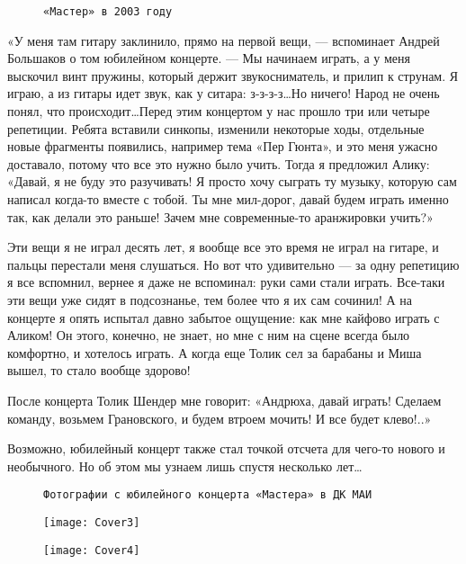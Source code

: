 \begin{figure}[h]
    \centering
    \caption{\texttt{«Мастер» в 2003 году}}
\end{figure}

«У меня там гитару заклинило, прямо на первой вещи, — вспоминает Андрей Большаков о том юбилейном концерте. — Мы
начинаем играть, а у меня выскочил винт пружины, который держит звукосниматель, и прилип к струнам. Я играю, а из гитары
идет звук, как у ситара: з-з-з-з\ldots Но ничего! Народ не очень понял, что происходит\ldots Перед этим концертом у нас
прошло три или четыре репетиции. Ребята вставили синкопы, изменили некоторые ходы, отдельные новые фрагменты появились,
например тема «Пер Гюнта», и это меня ужасно доставало, потому что все это нужно было учить. Тогда я предложил Алику:
«Давай, я не буду это разучивать! Я просто хочу сыграть ту музыку, которую сам написал когда-то вместе с тобой. Ты мне
мил-дорог, давай будем играть именно так, как делали это раньше! Зачем мне современные-то аранжировки учить?»

Эти вещи я не играл десять лет, я вообще все это время не играл на гитаре, и пальцы перестали меня слушаться. Но вот что
удивительно — за одну репетицию я все вспомнил, вернее я даже не вспоминал: руки сами стали играть. Все-таки эти вещи
уже сидят в подсознанье, тем более что я их сам сочинил! А на концерте я опять испытал давно забытое ощущение: как мне
кайфово играть с Аликом! Он этого, конечно, не знает, но мне с ним на сцене всегда было комфортно, и хотелось играть. А
когда еще Толик сел за барабаны и Миша вышел, то стало вообще здорово!

После концерта Толик Шендер мне говорит: «Андрюха, давай играть! Сделаем команду, возьмем Грановского, и будем втроем
мочить! И все будет клево!..»

Возможно, юбилейный концерт также стал точкой отсчета для чего-то нового и необычного. Но об этом мы узнаем лишь спустя
несколько лет\ldots

\begin{figure}[h]
    \centering
    \caption{\texttt{Фотографии с юбилейного концерта «Мастера» в ДК МАИ}}
\end{figure}


\begin{figure}[!ht]
    \centering
    \texttt{[image: Cover3]}
    \caption*{}
\end{figure}

\begin{figure}[!ht]
    \centering
    \texttt{[image: Cover4]}
    \caption*{}
\end{figure}

\restoregeometry


